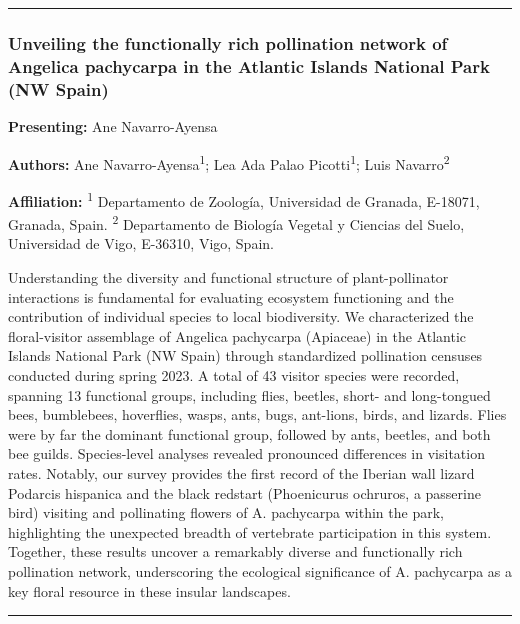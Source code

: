 \documentclass[
  letterpaper,
  DIV=11,
  numbers=noendperiod]{scrartcl}
\begin{document}
\begin{center}\rule{0.5\linewidth}{0.5pt}\end{center}

\subsubsection{Unveiling the functionally rich pollination network of
Angelica pachycarpa in the Atlantic Islands National Park (NW
Spain)}\label{unveiling-the-functionally-rich-pollination-network-of-angelica-pachycarpa-in-the-atlantic-islands-national-park-nw-spain}

\textbf{Presenting:} Ane Navarro-Ayensa

\textbf{Authors:} Ane Navarro-Ayensa\textsuperscript{1}; Lea Ada Palao
Picotti\textsuperscript{1}; Luis Navarro\textsuperscript{2}

\textbf{Affiliation:} \textsuperscript{1} Departamento de Zoología,
Universidad de Granada, E-18071, Granada, Spain. \textsuperscript{2}
Departamento de Biología Vegetal y Ciencias del Suelo, Universidad de
Vigo, E-36310, Vigo, Spain.

Understanding the diversity and functional structure of plant-pollinator
interactions is fundamental for evaluating ecosystem functioning and the
contribution of individual species to local biodiversity. We
characterized the floral-visitor assemblage of Angelica pachycarpa
(Apiaceae) in the Atlantic Islands National Park (NW Spain) through
standardized pollination censuses conducted during spring 2023. A total
of 43 visitor species were recorded, spanning 13 functional groups,
including flies, beetles, short- and long-tongued bees, bumblebees,
hoverflies, wasps, ants, bugs, ant-lions, birds, and lizards. Flies were
by far the dominant functional group, followed by ants, beetles, and
both bee guilds. Species-level analyses revealed pronounced differences
in visitation rates. Notably, our survey provides the first record of
the Iberian wall lizard Podarcis hispanica and the black redstart
(Phoenicurus ochruros, a passerine bird) visiting and pollinating
flowers of A. pachycarpa within the park, highlighting the unexpected
breadth of vertebrate participation in this system. Together, these
results uncover a remarkably diverse and functionally rich pollination
network, underscoring the ecological significance of A. pachycarpa as a
key floral resource in these insular landscapes.

\begin{center}\rule{0.5\linewidth}{0.5pt}\end{center}
\end{document}
